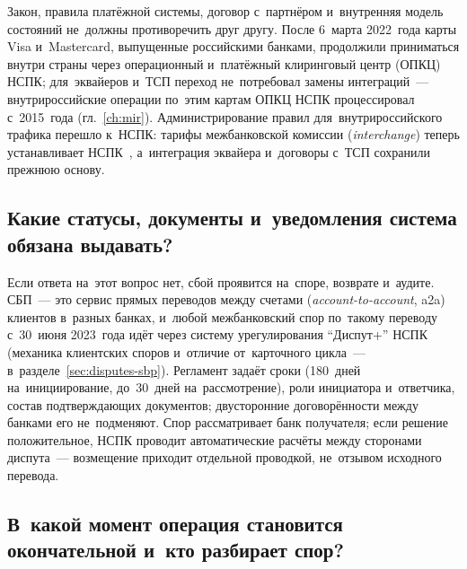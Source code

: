 Закон, правила платёжной системы, договор с~партнёром и~внутренняя модель
состояний не~должны противоречить друг другу. После 6~марта 2022~года карты
Visa и~Mastercard, выпущенные российскими банками, продолжили приниматься
внутри страны через операционный и~платёжный клиринговый центр (ОПКЦ) НСПК; для~эквайеров и~ТСП переход не~потребовал
замены интеграций~--- внутрироссийские операции по~этим картам ОПКЦ НСПК
процессировал с~2015~года (гл.~\ref{ch:mir}). Администрирование правил для~внутрироссийского трафика
перешло к~НСПК: тарифы межбанковской комиссии (\textit{interchange}) теперь
устанавливает НСПК~\cite{fz-161,rbc-nspk-fees-2022}, а~интеграция эквайера и~договоры
с~ТСП сохранили прежнюю основу.

\subsection*{Какие статусы, документы и~уведомления система обязана выдавать?}

Если ответа на~этот вопрос нет, сбой проявится на~споре, возврате и~аудите.
СБП~--- это сервис прямых переводов между счетами (\textit{account-to-account},
a2a) клиентов в~разных банках, и~любой межбанковский спор по~такому переводу
с~30~июня 2023~года идёт через систему урегулирования \enquote{Диспут+}
НСПК~\cite{nspk-dispute-plus-sbp-2023} (механика клиентских споров и~отличие
от~карточного цикла~--- в~разделе~\ref{sec:disputes-sbp}). Регламент задаёт
сроки (180~дней на~инициирование, до~30~дней на~рассмотрение), роли инициатора
и~ответчика, состав подтверждающих документов; двусторонние договорённости
между банками его не~подменяют. Спор рассматривает банк получателя; если
решение положительное, НСПК проводит автоматические расчёты между сторонами
диспута~---
возмещение приходит отдельной проводкой, не~отзывом исходного перевода.

\subsection*{В~какой момент операция становится окончательной и~кто
разбирает спор?}

